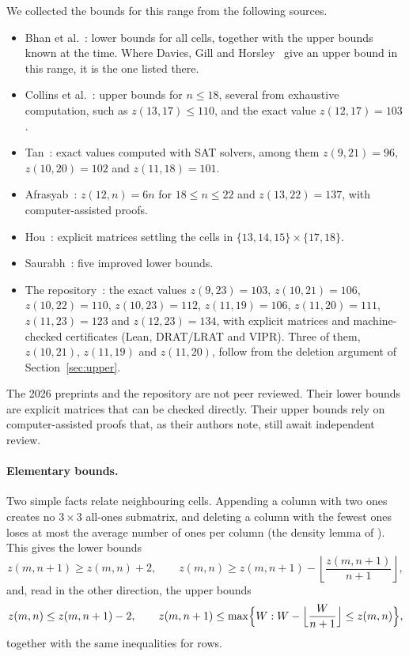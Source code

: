 \documentclass[11pt]{article}
\begin{document}
We collected the bounds for this range from the following sources.
\begin{itemize}
  \item Bhan et al.~\cite{BNRL26}: lower bounds for all cells, together with
    the upper bounds known at the time. Where Davies, Gill and
    Horsley~\cite[Table~2]{DGH26} give an upper bound in this range, it is
    the one listed there.
  \item Collins et al.~\cite[Table~4]{CRWR16}: upper bounds for $n\le18$,
    several from exhaustive computation, such as $z(13,17)\le110$, and the
    exact value $z(12,17)=103$.
  \item Tan~\cite[Table~3]{Tan22}: exact values computed with SAT solvers,
    among them $z(9,21)=96$, $z(10,20)=102$ and $z(11,18)=101$.
  \item Afrasyab~\cite{Afr26}: $z(12,n)=6n$ for $18\le n\le22$ and
    $z(13,22)=137$, with computer-assisted proofs.
  \item Hou~\cite{Hou26}: explicit matrices settling the cells in
    $\{13,14,15\}\times\{17,18\}$.
  \item Saurabh~\cite{Sau26}: five improved lower bounds.
  \item The repository~\cite{Fie26}: the exact values $z(9,23)=103$,
    $z(10,21)=106$, $z(10,22)=110$, $z(10,23)=112$, $z(11,19)=106$,
    $z(11,20)=111$, $z(11,23)=123$ and $z(12,23)=134$, with explicit
    matrices and machine-checked certificates (Lean, DRAT/LRAT and VIPR).
    Three of them, $z(10,21)$, $z(11,19)$ and $z(11,20)$, follow from the
    deletion argument of Section~\ref{sec:upper}.
\end{itemize}
The 2026 preprints \cite{Afr26,Hou26,Sau26} and the repository
\cite{Fie26} are not peer reviewed. Their lower bounds are explicit
matrices that can be checked directly. Their upper bounds rely on
computer-assisted proofs that, as their authors note, still await
independent review.

\paragraph{Elementary bounds.} Two simple facts relate neighbouring cells.
Appending a column with two ones creates no $3\times3$ all-ones submatrix,
and deleting a column with the fewest ones loses at most the average number
of ones per column (the density lemma of \cite[Lemma~3]{CRWR16}). This gives
the lower bounds
\begin{equation}\label{eq:mono}
  z(m,n+1)\ge z(m,n)+2,
  \qquad
  z(m,n)\ge z(m,n+1)-\left\lfloor \frac{z(m,n+1)}{n+1}\right\rfloor,
\end{equation}
and, read in the other direction, the upper bounds
\begin{equation}\label{eq:monoup}
  z(m,n)\le z(m,n+1)-2,
  \qquad
  z(m,n+1)\le\max\Bigl\{W : W-\Bigl\lfloor\frac{W}{n+1}\Bigr\rfloor\le z(m,n)\Bigr\},
\end{equation}
together with the same inequalities for rows.
\end{document}
